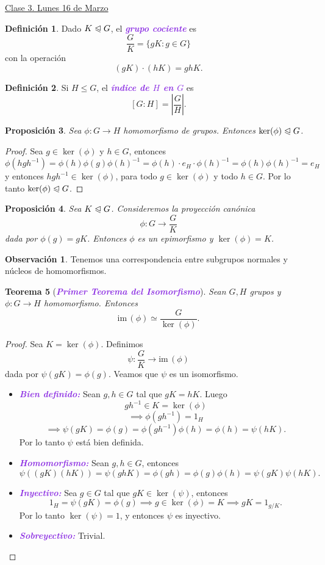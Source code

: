 \documentclass{article}
\newtheorem{theorem}{Teorema}[subsection]
\newtheorem{proposition}[theorem]{Proposición}
\theoremstyle{definition}
\newtheorem{definition}[theorem]{Definición}
\newtheorem*{obs}{Observación}
\theoremstyle{remark}
\numberwithin{equation}{section}
\renewcommand{\c}{\cdot}
\newcommand{\normal}{\trianglelefteqslant}
\newcommand{\im}{\mathrm{im}\,}
\newcommand{\abs}[1]{\left| #1 \right|}
\newcommand{\wea}[1]{\textcolor{BlueViolet}{\textbf{\emph{#1}}}}
\newcommand{\fecha}[1]{\begin{flushright} \underline{#1} \end{flushright}}
\begin{document}
\fecha{Clase 3. Lunes 16 de Marzo}

\begin{definition}
  Dado $K \normal G$, el \wea{grupo cociente} es
  \[\frac{G}{K} = \{gK : g \in G\}\]
  con la operación
  \[(gK) \c (hK) = ghK.\]
\end{definition}

\begin{definition}
  Si $H \leqslant G$, el \wea{índice de $H$ en $G$} es $$[G : H] = \abs{\frac{G}{H}}.$$
\end{definition}

\begin{proposition}
  Sea $\phi \colon G \to H$ homomorfismo de grupos. Entonces $\ker(\phi) \normal G$.
\end{proposition}
\begin{proof}
  Sea $g \in \ker(\phi)$ y $h \in G$, entonces
  \[\phi(hgh^{-1}) = \phi(h) \phi(g) \phi(h)^{-1} = \phi(h) \c e_H \c \phi(h)^{-1} = \phi(h) \phi(h)^{-1} = e_H\]
  y entonces $hgh^{-1} \in \ker(\phi)$, para todo $g \in \ker(\phi)$ y todo $h \in G$. Por lo tanto $\ker(\phi) \normal G$.
\end{proof}

\begin{proposition}
  Sea $K \normal G$. Consideremos la proyección canónica $$\phi \colon G \to \frac GK$$ dada por $\phi(g) = gK$. Entonces $\phi$ es un epimorfismo y $\ker(\phi) = K$.
\end{proposition}

\begin{obs}
  Tenemos una correspondencia entre subgrupos normales y núcleos de homomorfismos. %
\end{obs}

\begin{theorem}[\wea{Primer Teorema del Isomorfismo}]
  Sean $G,H$ grupos y $\phi \colon G \to H$ homomorfismo. Entonces
  \[\im(\phi) \simeq \frac{G}{\ker(\phi)}.\]
\end{theorem}
\begin{proof}
  Sea $K = \ker(\phi)$. Definimos $$\psi \colon \frac G K \to \im(\phi)$$ dada por $\psi(gK) = \phi(g)$. Veamos que $\psi$ es un isomorfismo.
  \begin{itemize}
    \item \wea{Bien definido:} Sean $g,h \in G$ tal que $gK = hK$. Luego
    $$gh^{-1} \in K = \ker(\phi)$$
    $$\implies \phi(gh^{-1}) = 1_H$$
    $$\implies \psi(gK) = \phi(g) = \phi(gh^{-1}) \phi(h) = \phi(h) = \psi(hK).$$
    Por lo tanto $\psi$ está bien definida.
    \item \wea{Homomorfismo:} Sean $g,h \in G$, entonces
    \[\psi((gK)(hK)) = \psi(ghK) = \phi(gh) = \phi(g) \phi(h) = \psi(gK) \psi(hK).\]
    \item \wea{Inyectivo:} Sea $g \in G$ tal que $gK \in \ker(\psi)$, entonces
    \[1_H = \psi(gK) = \phi(g) \implies g \in \ker(\phi) = K \implies gK = 1_{g/K}.\]
    Por lo tanto $\ker(\psi) = 1$, y entonces $\psi$ es inyectivo.
    \item \wea{Sobreyectivo:} Trivial. %
  \end{itemize}
\end{proof}
\end{document}
